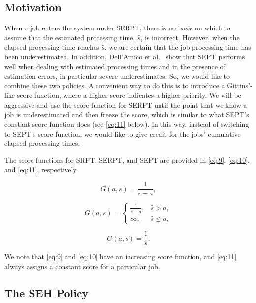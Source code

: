 \subsection{Motivation} \label{Motivation}
When a job enters the system under SERPT, there is no basis on which to assume that the estimated processing time, $\hat{s}$, is incorrect. However, when the elapsed processing time reaches $\hat{s}$, we are certain that the job processing time has been underestimated. In addition, Dell'Amico et al.\ \cite{dell2019scheduling} show that SEPT performs well when dealing with estimated processing times and in the presence of estimation errors, in particular severe underestimates. So, we would like to combine these two policies. A convenient way to do this is to introduce a Gittins'-like score function, where a higher score indicates a higher priority. We will be aggressive and use the score function for SERPT until the point that we know a job is underestimated and then freeze the score, which is similar to what SEPT's constant score function does (see \eqref{eq:11} below). In this way, instead of switching to SEPT's score function, we would like to give credit for the jobs' cumulative elapsed processing times.

The score functions for SRPT, SERPT, and
SEPT are provided in \eqref{eq:9}, \eqref{eq:10}, and \eqref{eq:11}, respectively.

\begin {equation}\label{eq:9}
G(a,s)=\frac{1}{{s - a}},
\end{equation}

\begin {equation}\label{eq:10}
G(a,\hat{s})=
\begin{cases}
\frac{1}{{\hat s - a}}, &  \hat s > a ,\\
\infty,  &  \hat s \le a,
\end{cases}
\end{equation}

\begin {equation}\label{eq:11}
G(a,\hat{s})=\frac{1}{{\hat s}}.
\end{equation}

We note that \eqref{eq:9} and \eqref{eq:10} have an increasing score function, and \eqref{eq:11} always assigns a constant score for a particular job.

\subsection{The SEH Policy} \label{FormalDefiniton}


